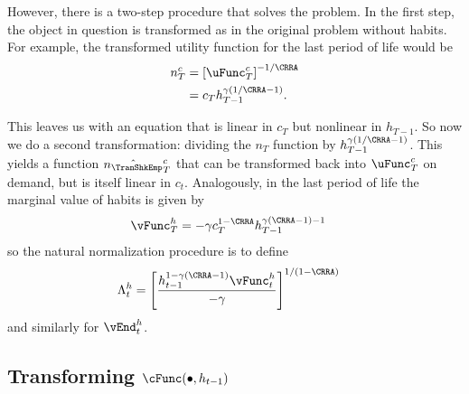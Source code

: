 \documentclass[titlepage, headings=optiontotocandhead]{\econtex}
\begin{document}
{  However, there is a two-step procedure that solves the problem.  In
  the first step, the object in question is transformed as in the
  original problem without habits.  For example, the transformed utility
  function for the last period of life would be
  \begin{equation}\begin{gathered}\begin{aligned}
        n_{T}^{c}  & = \left[\uFunc^{c}_{T}\right]^{-1/\CRRA}
        \\        & = {c}_{T}h_{T-1}^{\gamma(1/\CRRA-1)}.
      \end{aligned}\end{gathered}\end{equation}

  This leaves us with an equation that is linear in ${c}_{T}$ but
  nonlinear in $h_{T-1}$.  So now we do a second transformation:
  dividing the $n_{T}$ function by $h_{T-1}^{\gamma(1/\CRRA-1)}$.  This
  yields a function $\hat{n_{\TranShkEmp}}_{T}^{c}$ that can be transformed back into
  $\uFunc^{c}_{T}$ on demand, but is itself linear in ${c}_{t}.$  Analogously,
  in the last period of life the marginal value of habits is given by
  \begin{equation*}\begin{gathered}\begin{aligned}
        {\vFunc}_{T}^{h}  & = -\gamma {c}_{T}^{1-\CRRA}h_{T-1}^{\gamma(\CRRA-1)-1}
      \end{aligned}\end{gathered}\end{equation*}
  so the natural normalization procedure is to define
  \begin{equation}\begin{gathered}\begin{aligned}
        \Lambda_{t}^{h} 
        & =                           \left[\frac{h_{t-1}^{1-\gamma(\CRRA-1)}{\vFunc}_{t}^{h}}{-\gamma}\right]^{1/(1-\CRRA)}
      \end{aligned}\end{gathered}\end{equation}
  and similarly for $\vEnd_{t}^{h}$.


  \hypertarget{Transforming-cFunc}{}
  \subsection{Transforming $\cFunc(\bullet,h_{t-1})$}

}
\end{document}
